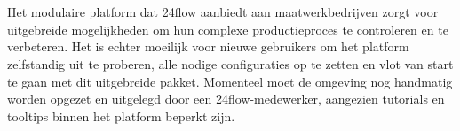 
%
%
%
%
%

%



\chapter*{}
Het modulaire platform dat 24flow aanbiedt aan maatwerkbedrijven zorgt voor uitgebreide mogelijkheden om hun complexe productieproces te controleren en te verbeteren. Het is echter moeilijk voor nieuwe gebruikers om het platform zelfstandig uit te proberen, alle nodige configuraties op te zetten en vlot van start te gaan met dit uitgebreide pakket. Momenteel moet de omgeving nog handmatig worden opgezet en uitgelegd door een 24flow-medewerker, aangezien tutorials en tooltips binnen het platform beperkt zijn.
\\

